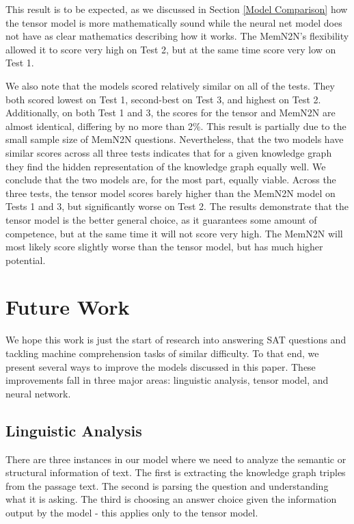 \documentclass[pageno]{final_paper}
\begin{document}
This result is to be expected, as we discussed in Section \ref{Model Comparison}
how the tensor model is more mathematically sound while the neural net model
does not have as clear mathematics describing how it works. The MemN2N's
flexibility allowed it to score very high on Test 2, but at the same time score
very low on Test 1.

We also note that the models scored relatively similar on all of the tests. They
both scored lowest on Test 1, second-best on Test 3, and highest on Test 2.
Additionally, on both Test 1 and 3, the scores for the tensor and MemN2N are
almost identical, differing by no more than 2\%. This result is partially due to
the small sample size of MemN2N questions. Nevertheless, that the two models
have similar scores across all three tests indicates that for a given knowledge
graph they find the hidden representation of the knowledge graph equally well.
We conclude that the two models are, for the most part, equally viable. Across
the three tests, the tensor model scores barely higher than the MemN2N model on
Tests 1 and 3, but significantly worse on Test 2. The results demonstrate that
the tensor model is the better general choice, as it guarantees some amount of
competence, but at the same time it will not score very high. The MemN2N will
most likely score slightly worse than the tensor model, but has much higher
potential.

\section{Future Work}
\label{Future Work}

We hope this work is just the start of research into answering SAT questions and
tackling machine comprehension tasks of similar difficulty. To that end, we
present several ways to improve the models discussed in this paper. These
improvements fall in three major areas: linguistic analysis, tensor model, and
neural network.

\subsection{Linguistic Analysis}
\label{Linguistic Analysis}

There are three instances in our model where we need to analyze the semantic or
structural information of text. The first is extracting the knowledge graph
triples from the passage text. The second is parsing the question and
understanding what it is asking. The third is choosing an answer choice given
the information output by the model - this applies only to the tensor model.
\end{document}
